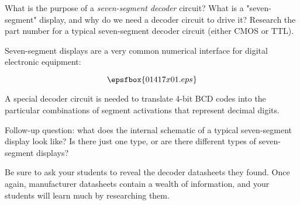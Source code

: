 

What is the purpose of a {\it seven-segment decoder} circuit?  What is a "seven-segment" display, and why do we need a decoder circuit to drive it?  Research the part number for a typical seven-segment decoder circuit (either CMOS or TTL).







Seven-segment displays are a very common numerical interface for digital electronic equipment:

$$\epsfbox{01417x01.eps}$$

A special decoder circuit is needed to translate 4-bit BCD codes into the particular combinations of segment activations that represent decimal digits.

\vskip 10pt

Follow-up question: what does the internal schematic of a typical seven-segment display look like?  Is there just one type, or are there different types of seven-segment displays?







Be sure to ask your students to reveal the decoder datasheets they found.  Once again, manufacturer datasheets contain a wealth of information, and your students will learn much by researching them.




